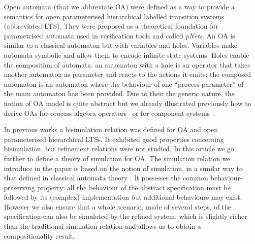 \documentclass[runningheads]{llncs}
\begin{document}
Open automata (that we abbreviate OA) were defined as a way to provide a semantics for open parameterised hierarchical labelled transition systems (abbreviated LTS). They were proposed as a theoretical foundation for parametrised automata used in verification tools and called \emph{pNets}.
An OA \cite{henrio:01299562} is similar to a classical automaton but with variables and holes. Variables make automata symbolic and allow them to encode infinite state systems. Holes enable the composition of automata: an automaton with a hole is an operator that takes another automaton as parameter and reacts to the actions it emits; the composed automaton is an automaton where the behaviour of one ``process parameter'' %
 of the main automaton has been provided.
Due to their the generic nature, the notion of OA model is quite abstract but we already illustrated previously how to derive OAs for process algebra operators~\cite{henrio:01299562} or for component systems~\cite{AMHEEMA:2023,ameurboulifa:01526055}.

In previous works \cite{AMHEEMA:2023,wang:03126313} a bisimulation relation was defined for OA and open parameterised hierarchical LTSs. It exhibited good properties concerning bisimulation, but refinement relations were not studied. In this article we go further to  define a theory of simulation for OA. The simulation relation we introduce in the paper  is based on the notion of   simulation,  in a similar way to that defined in classical automata theory \cite{Milner:1989,Bellegarde:2000}.   It possesses the common behaviour-preserving  property:  all the behaviour of the abstract specification must be followed by its (complex) implementation but additional behaviours may exist. However we also ensure that a whole scenario, made of several steps, of the specification can also be simulated by the refined system, which is slightly richer than the traditional simulation relation and  allows us to obtain a compositionality result.
\end{document}
